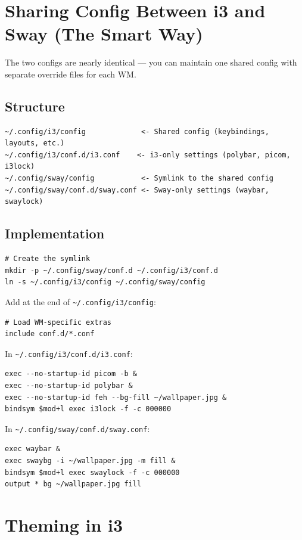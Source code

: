 \documentclass[12pt, a4paper]{book}
\begin{document}
\section{Sharing Config Between i3 and Sway (The Smart Way)}

The two configs are nearly identical --- you can maintain one shared config with separate override files for each WM.

\subsection{Structure}

\begin{lstlisting}
~/.config/i3/config             <- Shared config (keybindings, layouts, etc.)
~/.config/i3/conf.d/i3.conf    <- i3-only settings (polybar, picom, i3lock)
~/.config/sway/config           <- Symlink to the shared config
~/.config/sway/conf.d/sway.conf <- Sway-only settings (waybar, swaylock)
\end{lstlisting}

\subsection{Implementation}

\begin{lstlisting}
# Create the symlink
mkdir -p ~/.config/sway/conf.d ~/.config/i3/conf.d
ln -s ~/.config/i3/config ~/.config/sway/config
\end{lstlisting}

Add at the end of \texttt{\textasciitilde/.config/i3/config}:
\begin{lstlisting}
# Load WM-specific extras
include conf.d/*.conf
\end{lstlisting}

In \texttt{\textasciitilde/.config/i3/conf.d/i3.conf}:
\begin{lstlisting}
exec --no-startup-id picom -b &
exec --no-startup-id polybar &
exec --no-startup-id feh --bg-fill ~/wallpaper.jpg &
bindsym $mod+l exec i3lock -f -c 000000
\end{lstlisting}

In \texttt{\textasciitilde/.config/sway/conf.d/sway.conf}:
\begin{lstlisting}
exec waybar &
exec swaybg -i ~/wallpaper.jpg -m fill &
bindsym $mod+l exec swaylock -f -c 000000
output * bg ~/wallpaper.jpg fill
\end{lstlisting}

\section{Theming in i3}
\end{document}
